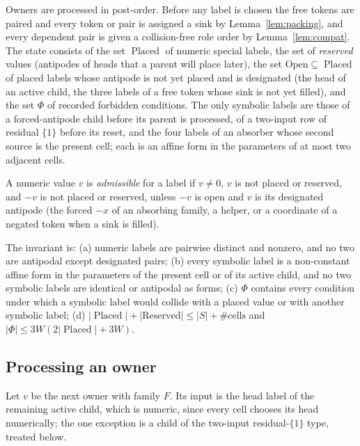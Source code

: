 \documentclass[11pt,a4paper]{article}
\theoremstyle{plain}
\theoremstyle{definition}
\theoremstyle{remark}
\DeclareMathOperator{\Placed}{Placed}
\begin{document}
Owners are processed in post-order.  Before any label is chosen the free
tokens are paired and every token or pair is assigned a sink by
Lemma~\ref{lem:packing}, and every dependent pair is given a collision-free
role order by Lemma~\ref{lem:compat}.  The state consists of the set $\Placed$
of numeric special labels, the set of \emph{reserved} values (antipodes of
heads that a parent will place later), the set $\mathrm{Open}\subseteq\Placed$
of placed labels whose antipode is not yet placed and is designated (the head
of an active child, the three labels of a free token whose sink is not yet
filled), and the set $\Phi$ of recorded forbidden conditions.  The only
symbolic labels are those of a forced-antipode child before its parent is
processed, of a two-input row of residual $\{1\}$ before its reset, and the
four labels of an absorber whose second source is the present cell; each is
an affine form in the parameters of at most two adjacent cells.

A numeric value $v$ is \emph{admissible} for a label if $v\ne 0$, $v$ is not
placed or reserved, and $-v$ is not placed or reserved, unless $-v$ is open and
$v$ is its designated antipode (the forced $-x$ of an absorbing family, a
helper, or a coordinate of a negated token when a sink is filled).

The invariant is: (a) numeric labels are pairwise distinct and nonzero, and no
two are antipodal except designated pairs; (b) every symbolic label is a
non-constant affine form in the parameters of the present cell or of its
active child, and no two symbolic labels are identical or antipodal as forms;
(c) $\Phi$ contains every condition under which a symbolic label would collide
with a placed value or with another symbolic label; (d)
$|\Placed|+|\mathrm{Reserved}|\le|S|+\#\text{cells}$ and $|\Phi|\le 3W(2|\Placed|+3W)$.

\subsection*{Processing an owner}

Let $v$ be the next owner with family $F$.  Its input is the head label of the
remaining active child, which is numeric, since every cell chooses its head
numerically; the one exception is a child of the two-input residual-$\{1\}$
type, treated below.
\end{document}
